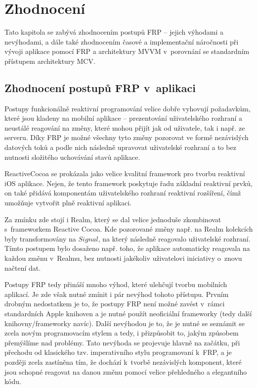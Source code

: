 \documentclass[thesis=M,czech]{FITthesis}[2012/06/26]
\begin{document}
\chapter{Zhodnocení}
Tato kapitola se zabývá zhodnocením postupů FRP -- jejich výhodami a nevýhodami, a dále také zhodnocením časové a implementační náročnosti při vývoji aplikace pomocí FRP a architektury MVVM v~porovnání se standardním přístupem architektury MCV.

\section{Zhodnocení postupů FRP v~aplikaci}
Postupy funkcionálně reaktivní programování velice dobře  vyhovují požadavkům, které jsou kladeny na mobilní aplikace --  prezentování uživatelského rozhraní a neustálé reagování na změny, které mohou přijít jak od uživatele, tak i např. ze serveru. Díky FRP je možné všechny tyto změny pozorovat ve formě nezávislých datových toků a podle nich následně upravovat uživatelské rozhraní a to bez nutnosti složitého uchovávání stavů aplikace.

ReactiveCocoa se prokázala jako velice kvalitní framework pro tvorbu reaktivní iOS aplikace. Nejen, že tento framework poskytuje řadu základní reaktivní prvků, on také přidává komponentám uživatelského rozhraní reaktivní rozšíření, čímž umožňuje vytvořit plně reaktivní aplikaci.

Za zmínku zde stojí i Realm, který se dal velice jednoduše zkombinovat s~frameworkem Reactive Cocoa. Kde pozorované změny např. na Realm kolekcích byly transformovány na $Signal$, na který následně reagovalo uživatelské rozhraní. Tímto postupem bylo dosaženo např. toho, že aplikace automaticky reagovala na každou změnu v~Realmu, bez nutnosti jakékoliv uživatelovi iniciativy o~znovu načtení dat.

Postupy FRP tedy přináší mnoho výhod, které ulehčují tvorbu mobilních aplikací. Je zde však nutné zmínit i pár nevýhod tohoto přístupu. Prvním drobným nedostatkem je to, že postupy FRP není možné zavést v~rámci standardních Apple knihoven a je nutné použít neoficiální frameworky (tedy další knihovny/frameworky navíc). Další nevýhodou je to, že je nutné se seznámit se zcela novým programovacím stylem a tedy, i přizpůsobit to, jakým způsobem přemýšlíme nad problémy. Tato nevýhoda se projevuje hlavně na začátku, při přechodu od klasického tzv. imperativního stylu programovaní k~FRP, a je později zcela zastíněna tím, že dochází k~tvorbě nezávislých komponent, které jsou schopné reagovat na danou změnu pomocí velice přehledného a elegantního kódu.
\end{document}
